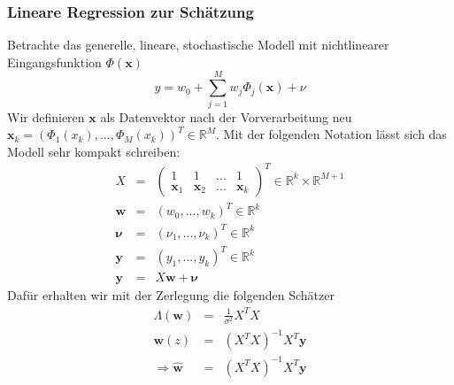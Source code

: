 	\subsubsection{Lineare Regression zur Schätzung}
	Betrachte das generelle, lineare, stochastische Modell mit nichtlinearer Eingangsfunktion $\Phi(\pmb{x})$
	\begin{equation*}
		y = w_0 + \sum_{j=1}^M w_j\Phi_j(\pmb{x}) + \nu
	\end{equation*}
	Wir definieren $\pmb{x}$ als Datenvektor nach der Vorverarbeitung neu $\pmb{x}_k = (\Phi_1(x_k),..., \Phi_M(x_k))^T \in \mathbb{R}^M$. Mit der folgenden Notation lässt sich das Modell sehr kompakt schreiben:
	\begin{eqnarray*}
		X &=& \begin{pmatrix}
				1 & 1 & ... & 1\\
				\pmb{x}_1 & \pmb{x}_2 & ... & \pmb{x}_k
		\end{pmatrix}^T \in \mathbb{R}^k \times \mathbb{R}^{M+1}\\
		\pmb{w} &=& (w_0,...,w_k)^T \in \mathbb{R}^k\\
		\pmb{\nu} &=& (\nu_1,...,\nu_k)^T \in \mathbb{R}^k\\
		\pmb{y} &=& (y_1,...,y_k)^T \in \mathbb{R}^k\\
		\pmb{y} &=& X\pmb{w}+\pmb{\nu}
	\end{eqnarray*}
	Dafür erhalten wir mit der Zerlegung die folgenden Schätzer
	\begin{eqnarray*}
		\Lambda(\pmb{w}) &=& \frac{1}{\sigma^2}X^TX\\
		\pmb{w}(z) &=& (X^TX)^{-1}X^T\pmb{y}\\
		\Rightarrow \pmb{\hat{w}} &=& (X^TX)^{-1}X^T\pmb{y}
	\end{eqnarray*}
